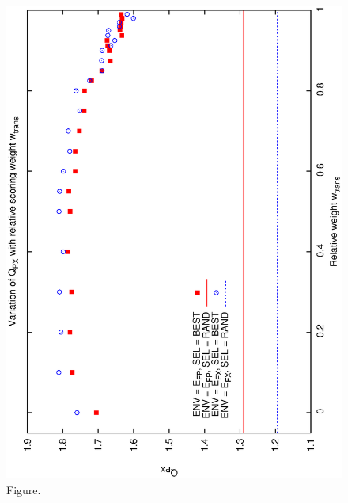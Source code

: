 \documentclass[12pt,a4paper]{article}
\begin{document}
\begin{figure}[htbp]
 \begin{center}
  \includegraphics[scale=1.0, angle=0]{figures/cs1_dw1a2_px.eps}
 \end{center}
  \caption[Figure.]
{Figure.}
\end{figure}
\clearpage
\end{document}
